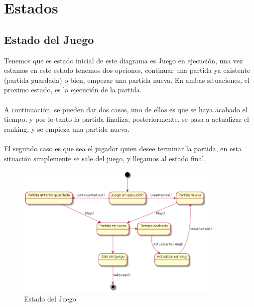 \section{Estados}\label{sec:uc0}


\subsection{Estado del Juego}\label{sec:uc0}

Tenemos que es estado inicial de este diagrama es Juego en ejecución, una vez estamos en este estado tenemos dos opciones, continuar una partida ya existente (partida guardada) o bien, empezar una partida nueva. En ambas situaciones, el proximo estado, es la ejecución de la partida.
  \\
  \\A continuación, se pueden dar dos casos, uno de ellos es que se haya acabado el tiempo, y por lo tanto la partida finaliza, posteriormente, se pasa a actualizar el ranking, y se empieza una partida nueva.
  \\
  \\El segundo caso es que sea el jugador quien desee terminar la partida, en esta situación simplemente se sale del juego, y llegamos al estado final.
  \\
  
 \begin{figure}[ht]
	\centering
	\includegraphics[width=0.9\textwidth]{./imatges/Estados_juego.png}
	\caption{Estado del Juego}
\end{figure} 


\newpage

